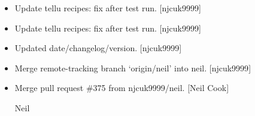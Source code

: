 \documentclass[a4paper,10pt,english]{report}
\begin{document}
\begin{itemize}
\item {} 
Update tellu recipes: fix after test run. {[}njcuk9999{]}

\item {} 
Update tellu recipes: fix after test run. {[}njcuk9999{]}

\item {} 
Updated date/changelog/version. {[}njcuk9999{]}

\item {} 
Merge remote-tracking branch ‘origin/neil’ into neil. {[}njcuk9999{]}

\item {} 
Merge pull request \#375 from njcuk9999/neil. {[}Neil Cook{]}

Neil

\end{itemize}
\end{document}
